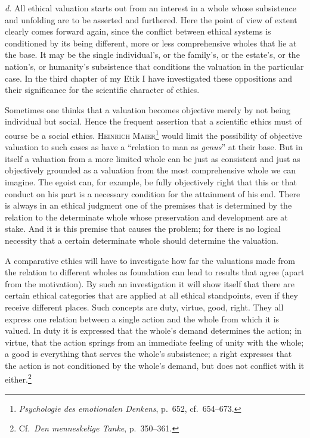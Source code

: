 \documentclass[12pt]{book}
\newcommand{\opage}[1]{\marginnote{\footnotesize\textit{[#1]}}}
\begin{document}
\textit{d.} All ethical valuation starts out from an interest in a whole whose
subsistence and unfolding are to be asserted and furthered. Here the point of view of
extent clearly comes forward again, since the conflict between ethical systems is
conditioned by its being different, more or less comprehensive wholes that lie at the
base. It may be the single individual's, or the family's, or the estate's, or the
nation's, or humanity's subsistence that conditions the valuation in the particular
case. In the third chapter of my Etik I have investigated these oppositions and their
significance for the scientific character of ethics.

Sometimes one thinks that a valuation becomes objective merely by not being individual
but social. Hence the frequent assertion that a scientific \opage{70}ethics must of course be a
social ethics. \textsc{Heinrich Maier}\footnote{\textit{Psychologie des emotionalen
Denkens}, p.\ 652, cf.\ 654--673.} would limit the possibility of objective valuation
to such cases as have a ``relation to man as \textit{genus}'' at their base. But in
itself a valuation from a more limited whole can be just as consistent and just as
objectively grounded as a valuation from the most comprehensive whole we can imagine.
The egoist can, for example, be fully objectively right that this or that conduct on his
part is a necessary condition for the attainment of his end. There is always in an
ethical judgment one of the premises that is determined by the relation to the
determinate whole whose preservation and development are at stake. And it is this
premise that causes the problem; for there is no logical necessity that a certain
determinate whole should determine the valuation.

A comparative ethics will have to investigate how far the valuations made from the
relation to different wholes as foundation can lead to results that agree (apart from
the motivation). By such an investigation it will show itself that there are certain
ethical categories that are applied at all ethical standpoints, even if they receive
different places. Such concepts are duty, virtue, good, right. They all express one
relation between a single action and the whole from which it is valued. In duty it is
expressed that the whole's demand determines the action; in virtue, that the action
springs from an immediate feeling of unity with the whole; a good is everything that
serves the whole's subsistence; a right expresses that the action is not conditioned by
the whole's demand, but does not conflict with it
either.\footnote{Cf.\ \textit{Den menneskelige Tanke}, p.\ 350--361.}
\end{document}
